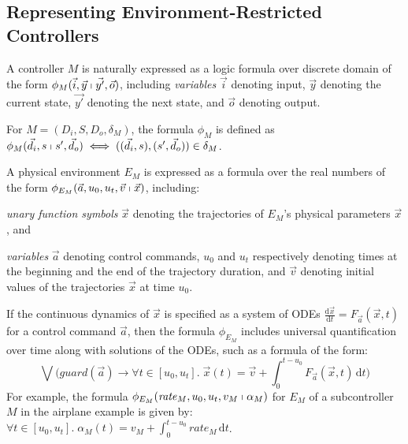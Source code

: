 \subsection{Representing Environment-Restricted Controllers}
\label{sec:discrete-encoding}

A controller $M$ is naturally 
expressed as a logic formula over discrete domain
of the form $\phi_M(\vec{i}, \vec{y} \shortmid \vec{y'}, \vec{o})$,
including \emph{variables}
$\vec{i}$ denoting input, 
$\vec{y}$ denoting the current state, 
$\vec{y'}$ denoting the next state, and 
$\vec{o}$  denoting output.

\begin{definition}
For  $M = (D_i,S,D_o,\delta_M)$,
the formula $\phi_M$ is defined as
$\phi_{M}(\vec{d}_i, s \shortmid s',  \vec{d}_o)
\iff
( (\vec{d}_i, s), (s', \vec{d}_o) ) \in \delta_{M}$.
\end{definition}



A physical environment $E_M$ is expressed as 
a formula over the real numbers %
of the form $\phi_{E_M}(\vec{a},u_0,u_t,\vec{v} \shortmid \vec{x})$,
including: \begin{inparaenum}[(i)]
	\item \emph{unary function symbols} $\vec{x}$ denoting the trajectories of $E_M$'s physical parameters $\vec{x}$,
	and
	\item \emph{variables} $\vec{a}$ denoting control commands, %
		$u_0$ and $u_t$ respectively denoting 
		times at the beginning and the end of the trajectory duration, and 
		$\vec{v}$ denoting initial values of the trajectories $\vec{x}$ at time $u_0$.
\end{inparaenum}


If the continuous dynamics of $\vec{x}$ is specified as a system of ODEs
$\frac{\mathrm{d}\vec{x}}{\mathrm{d}t}= F_{\vec{a}}(\vec{x},t)$
for a control command $\vec{a}$, then the formula $\phi_{E_M}$ 
includes universal quantification over time along with solutions of the ODEs, such as a formula of the form:
\[
\bigvee \big(\mathit{guard}(\vec{a}) \rightarrow
\forall t \in [u_0,u_t].\;
\vec{x}(t) = \vec{v} + \int_0^{t-u_0} \!  F_{\vec{a}}(\vec{x},t)\,\mathrm{d}t
\big)
\]
For example, 
the formula $\phi_{E_M}(\mathit{rate}_M,u_0,u_t,v_M \shortmid \alpha_M)$
for 
$E_M$ of a subcontroller $M$ in the airplane example is given by:
$\forall t \in [u_0, u_t].\; \alpha_M(t) = v_M + \int_0^{t-u_0}  \mathit{rate}_M \,\mathrm{d}t$.



